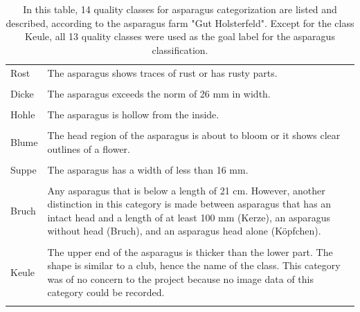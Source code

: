 \begin{table}[H]
\begin{tabular}{l p{11cm}}
		Rost & The asparagus shows traces of rust or has rusty parts. \\
		\\
		Dicke & The asparagus exceeds the norm of 26 mm in width. \\
		\\
		Hohle & The asparagus is hollow from the inside. \\
		\\
		Blume & The head region of the asparagus is about to bloom or it shows clear 					outlines of a flower. \\
		\\
		Suppe & The asparagus has a width of less than 16 mm. \\
		\\
		Bruch & Any asparagus that is below a length of 21 cm. However, another 						distinction in this category is made between asparagus that has an intact head and 		a length of at least 100 mm (Kerze),  an asparagus without head (Bruch), and an 				asparagus head alone (Köpfchen). \\
		\\
		Keule & The upper end of the asparagus is thicker than the lower part. The shape 				is similar to a club, hence the name of the class. This category was of no concern 		to the project because no image data of this category could be recorded. \\
		\\
		\hline
	\end{tabular}
	\caption[List of asparagus quality classes]{In this table, 14 quality classes for asparagus categorization are listed and described, according to the asparagus farm "Gut Holsterfeld". Except for the class Keule, all 13 quality classes were used as the goal label for the asparagus classification.}
	\label{tab:AsparagusLabels}
\end{table}


